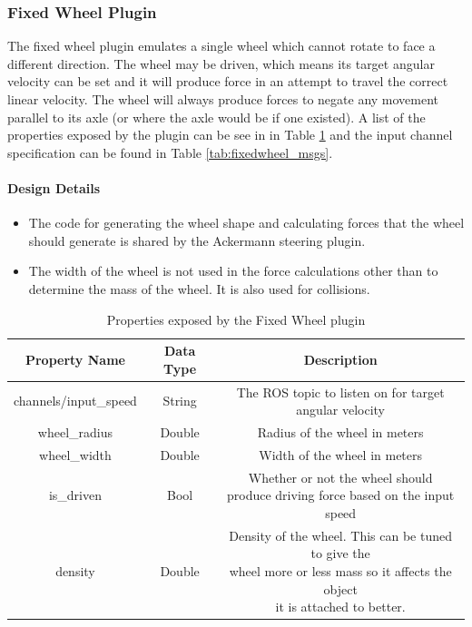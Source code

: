 \begin{itemize}
\subsubsection*{Fixed Wheel Plugin}
The fixed wheel plugin emulates a single wheel which cannot rotate to face a different direction. The wheel may be driven, which means its target angular velocity can be set and it will produce force in an attempt to travel the correct linear velocity. The wheel will always produce forces to negate any movement parallel to its axle (or where the axle would be if one existed). A list of the properties exposed by the plugin can be see in in Table \ref{tab:fixedwheel_props} and the input channel specification can be found in Table \ref{tab:fixedwheel_msgs}.
\paragraph{Design Details}
\begin{itemize}
\item The code for generating the wheel shape and calculating forces that the wheel should generate is shared by the Ackermann steering plugin.
\item The width of the wheel is not used in the force calculations other than to determine the mass of the wheel. It is also used for collisions.
\end{itemize}

\begin{table}[h!]
	\centering
	\caption{Properties exposed by the Fixed Wheel plugin}
	\label{tab:fixedwheel_props}
	\begin{tabular}{c|c|c}
	Property Name & Data Type & Description\\ \hline \hline
	channels/input\_speed & String & The ROS topic to listen on for target angular velocity \\ \hline
	wheel\_radius & Double & Radius of the wheel in meters\\ \hline
	wheel\_width & Double & Width of the wheel in meters\\ \hline
	is\_driven & Bool & \makecell{Whether or not the wheel should\\ produce driving force based on the input speed}\\ \hline
	density & Double & \makecell{Density of the wheel. This can be tuned to give the\\ wheel more or less mass so it affects the object\\ it is attached to better.}
	\end{tabular}
\end{table}


\end{itemize}
